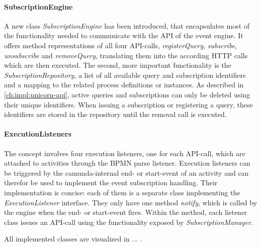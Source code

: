 
\paragraph{SubscriptionEngine}
A new class \textit{SubscriptionEngine} has been introduced, that encapsulates most of the functionality needed to communicate with the API of the event engine.
It offers method representations of all four API-calls, \textit{registerQuery}, \textit{subscribe}, \textit{unsubscribe} and \textit{removeQuery}, translating them into the according HTTP calls which are then executed.
The second, more important functionality is the \textit{SubscriptionRepository}, a list of all available query and subscription identifiers and a mapping to the related process definitions or instances.
As described in \autoref{ch:impl:unicorn-api}, active queries and subscriptions can only be deleted using their unique identifiers. 
When issuing a subscription or registering a query, these identifiers are stored in the repository until the removal call is executed.

\paragraph{ExecutionListeners}
The concept involves four execution listeners, one for each API-call, which are attached to activities through the BPMN parse listener.
Execution listeners can be triggered by the camunda-internal end- or start-event of an activity and can therefor be used to implement the event subscription handling.
Their implementation is concise: each of them is a separate class implementing the \textit{ExecutionListener} interface. They only have one method \textit{notify}, which is called by the engine when the end- or start-event fires.
Within the method, each listener class issues an API-call using the functionality exposed by \textit{SubscriptionManager}.


All implemented classes are visualized in ... .


